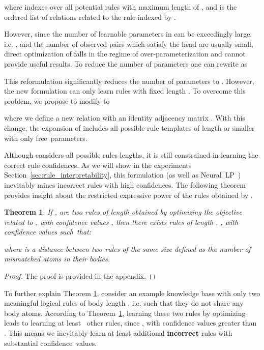 \documentclass{article}
\newtheorem{theorem}{Theorem}
\begin{document}
where  indexes over all potential rules with maximum length of , and  is the ordered list of relations related to the rule indexed by .

However, since the number of learnable parameters in  can be exceedingly large, i.e. , and the number of observed pairs  which satisfy the head  are usually small, direct optimization of  falls in the regime of over-parameterization and cannot provide useful results. To reduce the number of parameters one can rewrite  as

This reformulation significantly reduces the number of parameters to .
However, the new formulation can only learn rules with fixed length . To overcome this problem, we propose to modify  to

where
we define a new relation  with an identity adjacency matrix . With this change, the expansion of  includes all possible rule templates of length  or smaller with only  free~parameters.

Although  considers all possible rules lengths, it is still constrained in learning the correct rule confidences. As we will show in the experiments Section~\ref{sec:rule_interpretability}, this formulation (as well as Neural~LP~\cite{yang2017differentiable}) inevitably mines incorrect rules with high confidences. The following theorem provides insight about the restricted expressive power of the rules obtained by .

\begin{theorem}
\label{thr:theorem_1}
If ,  are two rules of length  obtained by optimizing the objective related to , with confidence values , then there exists  rules of length , , with confidence values  such~that:

where  is a distance between two rules of the same size defined as the number of mismatched atoms in their bodies.
\end{theorem}
\begin{proof} The proof is provided in the appendix.
\end{proof}

To further explain Theorem \ref{thr:theorem_1}, consider an example knowledge base with only two meaningful logical rules of body length , i.e.  such that they do not share any body atoms. According to Theorem~\ref{thr:theorem_1}, learning these two rules by optimizing  leads to learning at \mbox{least~} other rules, since , with confidence values greater than . This means we inevitably learn at least  additional \textbf{incorrect} rules with substantial confidence~values.
\end{document}
